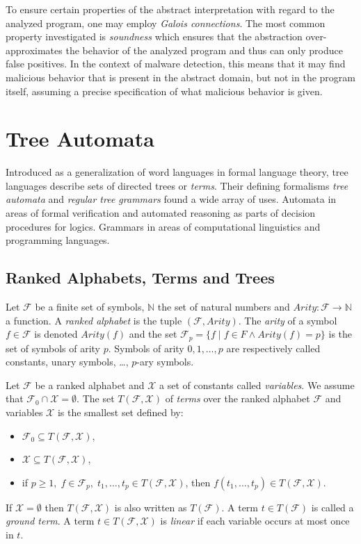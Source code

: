 To ensure certain properties of the abstract interpretation with regard to the analyzed program, one may employ \emph{Galois connections}. The most common property investigated is \emph{soundness} which ensures that the abstraction over-approximates the behavior of the analyzed program and thus can only produce false positives. In the context of malware detection, this means that it may find malicious behavior that is present in the abstract domain, but not in the program itself, assuming a precise specification of what malicious behavior is given.

\section{Tree Automata}
Introduced as a generalization of word languages in formal language theory, tree languages describe sets of directed trees or \emph{terms}. Their defining formalisms \emph{tree automata} and \emph{regular tree grammars} found a wide array of uses. Automata in areas of formal verification and automated reasoning as parts of decision procedures for logics. Grammars in areas of computational linguistics and programming languages.

\subsection{Ranked Alphabets, Terms and Trees}
\begin{defn}
Let $\mathcal{F}$ be a finite set of symbols, $\mathbb{N}$ the set of natural numbers and $Arity: \mathcal{F} \rightarrow \mathbb{N}$ a function. A \emph{ranked alphabet} is the tuple $(\mathcal{F}, Arity)$. The \emph{arity} of a symbol $f \in \mathcal{F}$ is denoted $Arity(f)$ and the set $\mathcal{F}_p = \{f \; | \; f \in F \wedge Arity(f) = p\}$ is the set of symbols of arity $p$. Symbols of arity $0, 1, \dots, p$ are respectively called constants, unary symbols, \dots, $p$-ary symbols.
\end{defn}

\begin{defn}
Let $\mathcal{F}$ be a ranked alphabet and $\mathcal{X}$ a set of constants called \emph{variables}. We assume that $\mathcal{F}_0 \cap \mathcal{X} = \emptyset$. The set $T(\mathcal{F}, \mathcal{X})$ of \emph{terms} over the ranked alphabet $\mathcal{F}$ and variables $\mathcal{X}$ is the smallest set defined by:
\begin{itemize}
    \item $\mathcal{F}_0 \subseteq T(\mathcal{F}, \mathcal{X})$,
    \item $\mathcal{X} \subseteq T(\mathcal{F}, \mathcal{X})$,
    \item if $p \geq 1, \; f \in \mathcal{F}_p, \; t_1,\dots, t_p \in T(\mathcal{F}, \mathcal{X})$, then $f(t_1,\dots, t_p) \in T(\mathcal{F}, \mathcal{X})$.
\end{itemize}
If $\mathcal{X} = \emptyset$ then $T(\mathcal{F}, \mathcal{X})$ is also written as $T(\mathcal{F})$. A term $t \in T(\mathcal{F})$ is called a \emph{ground term}. A term $t \in T(\mathcal{F}, \mathcal{X})$ is \emph{linear} if each variable occurs at most once in $t$.
\end{defn}

